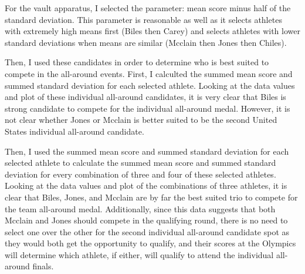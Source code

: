 \documentclass[12pt]{article}
\begin{document}
For the vault apparatus, I selected the parameter: mean score minus half of the standard deviation. 
This parameter is reasonable as well as it selects athletes with extremely high means first (Biles then Carey) and selects 
athletes with lower standard deviations when means are similar (Mcclain then Jones then Chiles). 

Then, I used these candidates in order to determine who is best suited to compete in the all-around events. 
First, I calculted the summed mean score and summed standard deviation for each selected athlete. Looking at the data 
values and plot of these individual all-around candidates, it is very clear that Biles is strong candidate to 
compete for the individual all-around medal. However, it is not clear whether Jones or Mcclain is better suited 
to be the second United States individual all-around candidate.

Then, I used the summed mean score and summed standard deviation for each selected athlete to calculate the 
summed mean score and summed standard deviation for every combination of 
three and four of these selected athletes. Looking at the data values and plot of the combinations of three athletes, 
it is clear that Biles, Jones, and Mcclain are by far the best suited trio to compete for the team all-around medal. 
Additionally, since this data suggests that both Mcclain and Jones should compete in the qualifying round, there 
is no need to select one over the other for the second individual all-around candidate spot as they would both get 
the opportunity to qualify, and their scores at the Olympics will determine which athlete, if either, will qualify 
to attend the individual all-around finals. 
\end{document}
